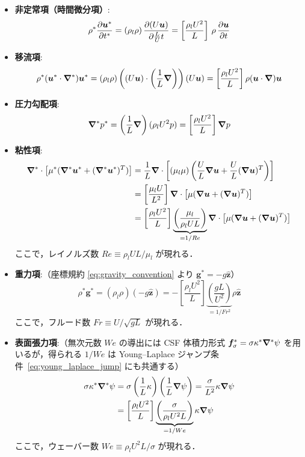 \begin{itemize}
    \item \textbf{非定常項（時間微分項）}:
    \[
      \rho^* \dfrac{\partial \bm{u}^*}{\partial t^*}
      = (\rho_l\rho)\,\dfrac{\partial (U\bm{u})}{\partial \frac{L}{U}t}
      = \left[\frac{\rho_l U^2}{L}\right]\,\rho\,\dfrac{\partial \bm{u}}{\partial t}
    \]

    \item \textbf{移流項}:
    \[
      \rho^* (\bm{u}^* \cdot \bm{\nabla}^*) \bm{u}^*
      = (\rho_l\rho) \left( (U\bm{u}) \cdot \left(\frac{1}{L}\bm{\nabla}\right) \right) (U\bm{u})
      = \left[\frac{\rho_l U^2}{L}\right] \rho(\bm{u}\cdot\bm{\nabla})\bm{u}
    \]

    \item \textbf{圧力勾配項}:
    \[
      \bm{\nabla}^* p^* = \left(\frac{1}{L}\bm{\nabla}\right) (\rho_l U^2 p)
      = \left[\frac{\rho_l U^2}{L}\right] \bm{\nabla} p
    \]

    \item \textbf{粘性項}:
    \begin{align*}
     \bm{\nabla}^*\cdot\bigl[\mu^*(\bm{\nabla}^*\bm{u}^* + (\bm{\nabla}^*\bm{u}^*)^T)\bigr]
     &= \frac{1}{L}\bm{\nabla}\cdot\left[
         (\mu_l\mu)\left(\frac{U}{L}\bm{\nabla}\bm{u} + \frac{U}{L}(\bm{\nabla}\bm{u})^T\right)
        \right] \\
     &= \left[\frac{\mu_l U}{L^2}\right]\bm{\nabla}\cdot\bigl[\mu(\bm{\nabla}\bm{u}+(\bm{\nabla}\bm{u})^T)\bigr] \\
     &= \left[\frac{\rho_l U^2}{L}\right]
        \underbrace{\left(\frac{\mu_l}{\rho_l U L}\right)}_{=1/Re}
        \bm{\nabla}\cdot\bigl[\mu(\bm{\nabla}\bm{u}+(\bm{\nabla}\bm{u})^T)\bigr]
    \end{align*}
    ここで，レイノルズ数 $Re \equiv \rho_l U L / \mu_l$ が現れる．

    \item \textbf{重力項}:（座標規約 \eqref{eq:gravity_convention} より $\bm{g}^* = -g\hat{\bm{z}}$）
    \[
      \rho^* \bm{g}^*
      = (\rho_l\rho) (-g\hat{\bm{z}})
      = -\left[\frac{\rho_l U^2}{L}\right]
        \underbrace{\left(\frac{gL}{U^2}\right)}_{=1/Fr^2}
        \rho \hat{\bm z}
    \]
    ここで，フルード数 $Fr \equiv U/\sqrt{gL}$ が現れる．

    \item \textbf{表面張力項}:（無次元数 $We$ の導出には CSF 体積力形式 $\bm{f}_\sigma^* = \sigma\kappa^*\bm{\nabla}^*\psi$ を用いるが，得られる $1/We$ は Young--Laplace ジャンプ条件~\eqref{eq:young_laplace_jump} にも共通する）
    \begin{align*}
      \sigma\kappa^*\bm{\nabla}^*\psi
      &= \sigma \left(\frac{1}{L}\kappa\right) \left(\frac{1}{L}\bm{\nabla}\psi\right)
       = \frac{\sigma}{L^2}\kappa\bm{\nabla}\psi \\
      &= \left[\frac{\rho_l U^2}{L}\right]
         \underbrace{\left(\frac{\sigma}{\rho_l U^2 L}\right)}_{=1/We}
         \kappa\bm{\nabla}\psi
    \end{align*}
    ここで，ウェーバー数 $We \equiv \rho_l U^2 L / \sigma$ が現れる．
\end{itemize}

